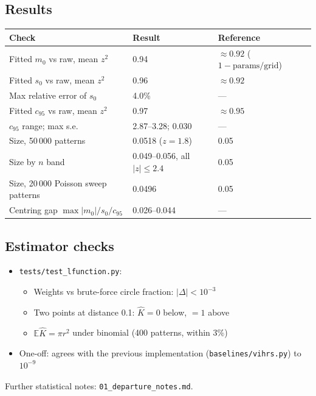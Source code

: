 \documentclass[11pt]{article}
\begin{document}
\subsection*{Results}
\begin{tabular}{@{}lll@{}}
\toprule
Check & Result & Reference \\
\midrule
Fitted $m_0$ vs raw, mean $z^2$ & 0.94 & $\approx 0.92$ ($1 - \text{params}/\text{grid}$) \\
Fitted $s_0$ vs raw, mean $z^2$ & 0.96 & $\approx 0.92$ \\
Max relative error of $s_0$ & 4.0\% & --- \\
Fitted $c_{95}$ vs raw, mean $z^2$ & 0.97 & $\approx 0.95$ \\
$c_{95}$ range; max s.e. & 2.87--3.28; 0.030 & --- \\
Size, 50\,000 patterns & 0.0518 ($z = 1.8$) & 0.05 \\
Size by $n$ band & 0.049--0.056, all $|z| \le 2.4$ & 0.05 \\
Size, 20\,000 Poisson sweep patterns & 0.0496 & 0.05 \\
Centring gap $\max|m_0|/s_0/c_{95}$ & 0.026--0.044 & --- \\
\bottomrule
\end{tabular}

\subsection*{Estimator checks}
\begin{itemize}
  \item \texttt{tests/test\_lfunction.py}:
  \begin{itemize}
    \item Weights vs brute-force circle fraction: $|\Delta| < 10^{-3}$
    \item Two points at distance 0.1: $\hat K = 0$ below, $=1$ above
    \item $\mathbb E\hat K = \pi r^2$ under binomial (400 patterns, within 3\%)
  \end{itemize}
  \item One-off: agrees with the previous implementation (\texttt{baselines/vihrs.py}) to $10^{-9}$
\end{itemize}

Further statistical notes: \texttt{01\_departure\_notes.md}.
\end{document}
